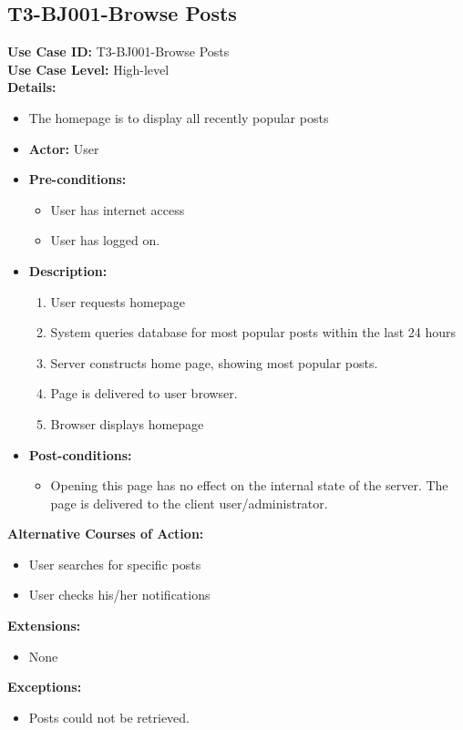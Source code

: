 \subsection{T3-BJ001-Browse Posts}
\textbf{Use Case ID:} T3-BJ001-Browse Posts\\
\textbf{Use Case Level:} High-level\\
\textbf{Details:}
\begin{itemize}
    \item The homepage is to display all recently popular posts
    \item \textbf{Actor:} User
    \item \textbf{Pre-conditions:}
    \begin{itemize}
        \item User has internet access
        \item User has logged on.
    \end{itemize}
    \item \textbf{Description:}
    \begin{enumerate}
        \item User requests homepage
        \item System queries database for most popular posts within the last 24 hours
        \item Server constructs home page, showing most popular posts.
        \item Page is delivered to user browser.
        \item Browser displays homepage
    \end{enumerate}
    \item \textbf{Post-conditions:}
    \begin{itemize}
        \item Opening this page has no effect on the internal state of the server. The page is delivered to the client user/administrator.
    \end{itemize}
\end{itemize}
\textbf{Alternative Courses of Action:}
\begin{itemize}
    \item User searches for specific posts
    \item User checks his/her notifications
\end{itemize}
\textbf{Extensions:}
\begin{itemize}
    \item None
\end{itemize}
\textbf{Exceptions:}
\begin{itemize}
    \item Posts could not be retrieved.
\end{itemize}
